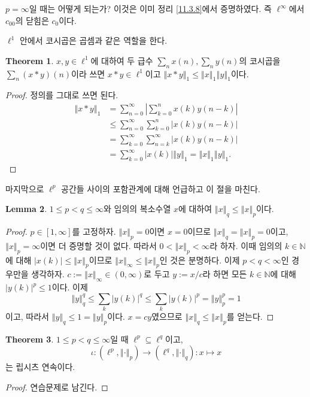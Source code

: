 \documentclass[11pt]{book}
\numberwithin{equation}{chapter}
\def\NN{\mathbb{N}}
\newcommand{\abs}[1]{\left\vert#1\right\vert}
\newcommand{\norm}[1]{\left\Vert#1\right\Vert}
\theoremstyle{definition}
\newtheorem{thm}{Theorem}[section]
\newtheorem{lem}[thm]{Lemma}
\begin{document}
\(p = \infty\)일 때는 어떻게 되는가? 이것은 이미 정리 \ref{11.3.8}에서 증명하였다. 즉 \(\ell^\infty\)에서 \(c_{00}\)의 닫힘은 \(c_0\)이다.

\(\ell^1\) 안에서 코시곱은 곱셈과 같은 역할을 한다.

\begin{thm} \label{13.4.11}
    \(x, y \in \ell^1\)에 대하여 두 급수 \(\sum_n x(n), \sum_n y(n)\)의 코시곱을 \(\sum_n (x * y)(n)\)이라 쓰면 \(x * y \in \ell^1\)이고 \(\norm{x * y}_1 \le \norm{x}_1 \norm{y}_1\)이다.
\end{thm}
\begin{proof}
    정의를 그대로 쓰면 된다.
    \begin{align*}
        \norm{x * y}_1 &= \sum_{n=0}^\infty \abs{\sum_{k=0}^n x(k) y(n-k)}\\
        &\le \sum_{n=0}^\infty \sum_{k=0}^n \abs{x(k) y(n-k)}\\
        &= \sum_{k=0}^\infty \sum_{n=k}^\infty \abs{x(k) y(n-k)}\\
        &= \sum_{k=0}^\infty \abs{x(k)} \norm{y}_1 = \norm{x}_1\norm{y}_1.
    \end{align*}
\end{proof}

마지막으로 \(\ell^p\) 공간들 사이의 포함관계에 대해 언급하고 이 절을 마친다.

\begin{lem}
    \(1 \le p < q \le \infty\)와 임의의 복소수열 \(x\)에 대하여 \(\norm{x}_q \le \norm{x}_p\)이다.
\end{lem}
\begin{proof}
    \(p \in [1, \infty]\)를 고정하자. \(\norm{x}_p = 0\)이면 \(x = 0\)이므로 \(\norm{x}_q = \norm{x}_p = 0\)이고, \(\norm{x}_p = \infty\)이면 더 증명할 것이 없다. 따라서 \(0 < \norm{x}_p < \infty\)라 하자. 이때 임의의 \(k \in \NN\)에 대해 \(\abs{x(k)} \le \norm{x}_p\)이므로 \(\norm{x}_{\infty} \le \norm{x}_p\)인 것은 분명하다. 이제 \(p  < q < \infty\)인 경우만을 생각하자. \(c := \norm{x}_{\infty} \in (0, \infty)\)로 두고 \(y := x / c\)라 하면 모든 \(k \in \NN\)에 대해 \(\abs{y(k)}^p \le 1\)이다. 이제
    \[
    \norm{y}_q^q \le \sum_{k} \abs{y(k)}^q \le \sum_{k} \abs{y(k)}^p = \norm{y}_p^p = 1   
    \]
    이고, 따라서 \(\norm{y}_q \le 1 = \norm{y}_p\)이다. \(x = cy\)였으므로 \(\norm{x}_q \le \norm{x}_p\)를 얻는다.
\end{proof}

\begin{thm}
    \(1 \le p < q \le \infty\)일 때 \(\ell^p \subseteq \ell^q\)이고,
    \[
        \iota : (\ell^p, \norm{\cdot}_p) \to (\ell^q, \norm{\cdot}_q) : x \mapsto x
    \]
    는 립시츠 연속이다.
\end{thm}
\begin{proof}
    연습문제로 남긴다.
\end{proof}
\end{document}

